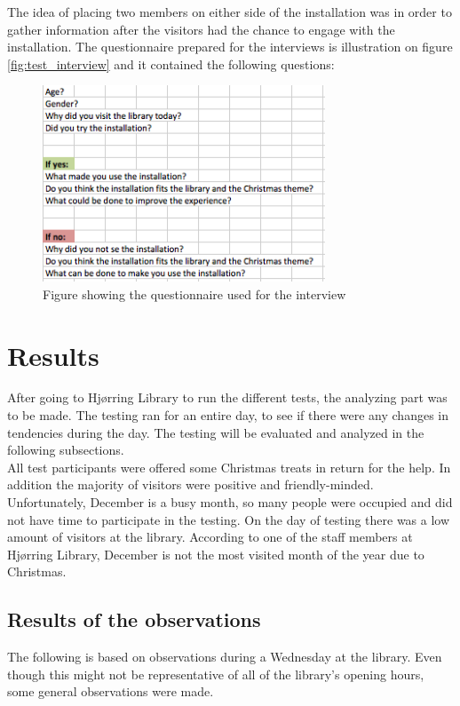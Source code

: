 The idea of placing two members on either side of the installation was in order to gather information after the visitors had the chance to engage with the installation. The questionnaire prepared for the interviews is illustration on figure \eqref{fig:test_interview} and it contained the following questions:

\begin{figure}[H] 
\centering 
\includegraphics[width=0.75\textwidth]{Pictures/Test/Interview.png} 
\caption{Figure showing the questionnaire used for the interview} 
\label{fig:test_interview} 
\end{figure}

\section{Results}
After going to Hj{\o}rring Library to run the different tests, the analyzing part was to be made. The testing ran for an entire day, to see if there were any changes in tendencies during the day. The testing will be evaluated and analyzed in the following subsections.\\
All test participants were offered some Christmas treats in return for the help. In addition the majority of visitors were positive and friendly-minded. Unfortunately, December is a busy month, so many people were occupied and did not have time to participate in the testing. On the day of testing there was a low amount of visitors at the library. According to one of the staff members at Hj{\o}rring Library, December is not the most visited month of the year due to Christmas.

\subsection{Results of the observations}
The following is based on observations during a Wednesday at the library. Even though this might not be representative of all of the library's opening hours, some general observations were made.

